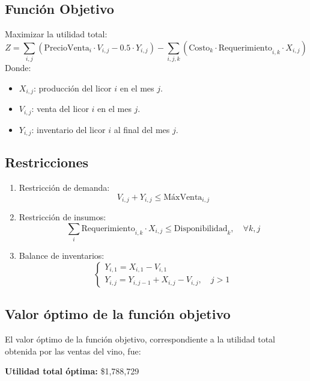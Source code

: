 \documentclass[12pt, a4paper, oneside]{book}
\theoremstyle{definition}
\begin{document}
    \subsection{Función Objetivo}
    Maximizar la utilidad total:
    \[
    Z = \sum_{i,j} (\text{PrecioVenta}_{i} \cdot V_{i,j} - 0.5 \cdot Y_{i,j}) - \sum_{i,j,k} (\text{Costo}_{k} \cdot \text{Requerimiento}_{i,k} \cdot X_{i,j})
    \]
    Donde:
    \begin{itemize}
    \item $X_{i,j}$: producción del licor $i$ en el mes $j$.
    \item $V_{i,j}$: venta del licor $i$ en el mes $j$.
    \item $Y_{i,j}$: inventario del licor $i$ al final del mes $j$.
    \end{itemize}

    \subsection{Restricciones}
    \begin{enumerate}
    \item Restricción de demanda:
    \[
    V_{i,j} + Y_{i,j} \leq \text{MáxVenta}_{i,j}
    \]
    
    \item Restricción de insumos:
    \[
    \sum_i \text{Requerimiento}_{i,k} \cdot X_{i,j} \leq \text{Disponibilidad}_{k}, \quad \forall k, j
    \]
    
    \item Balance de inventarios:
    \[
    \begin{cases}
    Y_{i,1} = X_{i,1} - V_{i,1} \\
    Y_{i,j} = Y_{i,j-1} + X_{i,j} - V_{i,j}, \quad j > 1
    \end{cases}
    \]
    \end{enumerate}


    \subsection{Valor óptimo de la función objetivo}

    El valor óptimo de la función objetivo, correspondiente a la utilidad total obtenida por las ventas del vino, fue:

    \begin{center}
    \textbf{Utilidad total óptima:} \$1,788,729
    \end{center}
\end{document}
